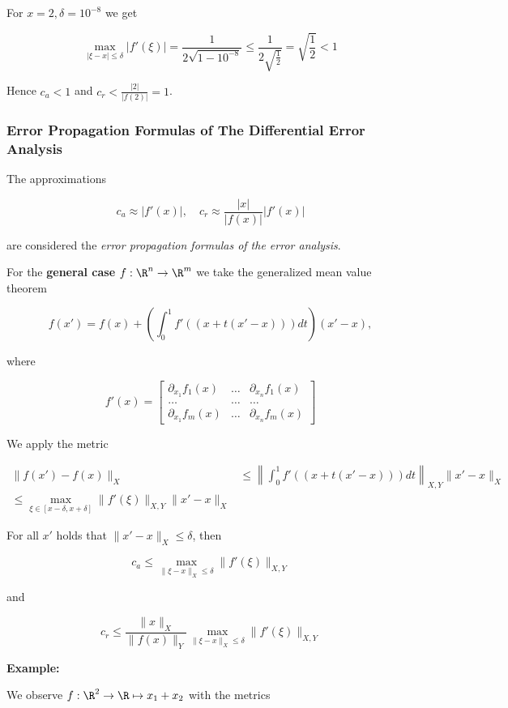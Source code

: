 For \(x = 2, \delta = 10^{-8}\) we get 

\[
    \max_{|\xi - x| \le \delta} |f'(\xi)| = \frac{1}{2\sqrt{1 - 10^{-8}}} \le \frac{1}{2 \sqrt{\frac{1}{2}}} = \sqrt{\frac{1}{2}} < 1
\]

Hence \(c_a < 1\) and \(c_r < \frac{|2|}{|f(2)|} = 1\).


\subsubsection{Error Propagation Formulas of The Differential Error Analysis}

The approximations

\[
    c_a \approx |f'(x)|, \quad c_r \approx \frac{|x|}{|f(x)|}|f'(x)|
\]

are considered the \emph{error propagation formulas of the error analysis}.

For the \textbf{general case} \(f: \R^n \to \R^m\) we take the generalized mean value theorem 

\[
    f(x') = f(x) + \left(\int_{0}^{1} f'((x + t(x' - x)))dt\right)(x' - x),
\]

where 

\[
    f'(x) = 
    \begin{bmatrix}
        \partial_{x_1} f_1 (x) & \dots & \partial_{x_n} f_1 (x) \\ 
        \dots & \dots & \dots \\ 
        \partial_{x_1} f_m (x) & \dots & \partial_{x_n} f_m (x)
    \end{bmatrix}
\]

We apply the metric 

\begin{align*}
    \|f(x') - f(x)\|_X &\le \left\|\int_{0}^{1} f'((x + t(x' - x)))dt \right\|_{X,Y} \|x' - x\|_X \\ 
    \le \max_{\xi \in [x - \delta, x + \delta]} \|f'(\xi)\|_{X,Y} \|x' - x\|_X
\end{align*}

For all \(x'\) holds that \(\|x' - x\|_X \le \delta\), then 

\[
    c_a \le \max_{\|\xi - x\|_X \le \delta} \|f'(\xi)\|_{X,Y}
\]

and 

\[
    c_r \le \frac{\|x\|_X}{\|f(x)\|_Y}\max_{\|\xi - x\|_X \le \delta} \|f'(\xi)\|_{X,Y}
\]

\textbf{Example:}

We observe \(f: \R^2 \to \R \mapsto x_1 + x_2\) with the metrics 

